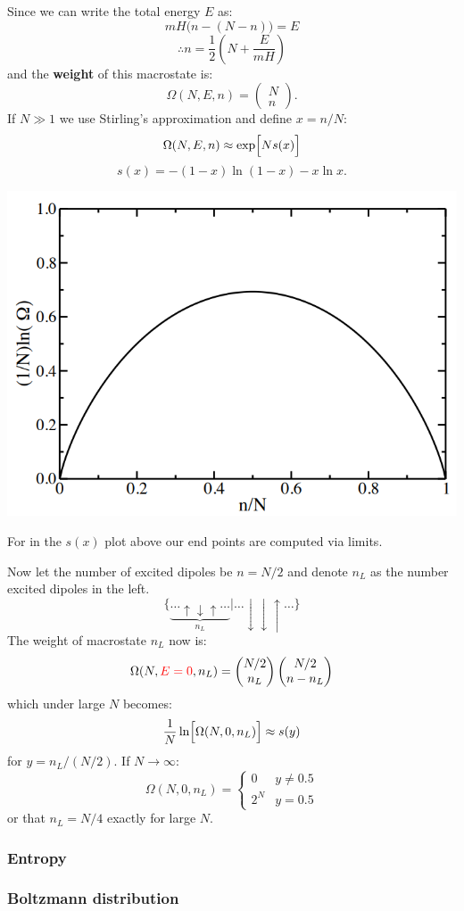 \documentclass{article}
\begin{document}
\begin{multicols*}{3}
Since we can write the total energy $E$ as:
$$mH\bigl(n-(N-n)\bigr)=E$$
$$\therefore n=\frac{1}{2}\left(N+\frac{E}{mH}\right)$$
and the \textbf{weight} of this macrostate is:
$$\Omega(N,E,n)=\begin{pmatrix}
N \\ n\end{pmatrix}.$$
If $N\gg1$ we use Stirling's approximation
and define $x=n/N$: 
$$\Omega(N,E,n)\approx\exp\Bigl[N s(x)\Bigr]$$
$$s(x)=-(1-x)\ln(1-x)-x\ln x.$$
\begin{center}
    \includegraphics*[scale=0.5]{f00.png}
\end{center}
For in the $s(x)$ plot above
our end points are computed via limits.

Now let the number of excited dipoles be
$n=N/2$ and denote $n_L$ as the number excited
dipoles in the left.
$$\{\underbrace{\dots\uparrow
\downarrow\uparrow\dots}_{\text{$n_L$}}|
\dots\downarrow\downarrow\uparrow\dots\}$$
The weight of macrostate $n_L$ now is:
$$\Omega(N,\textcolor{red}{E=0},n_L)=
\begin{pmatrix}N/2 \\ n_L\end{pmatrix}
\begin{pmatrix}N/2 \\ n-n_L\end{pmatrix}$$
which under large $N$ becomes:
$$\frac{1}{N}\ln\Bigl[\Omega(N,0,n_L)\Bigr]\approx s(y)$$
for $y=n_L/(N/2)$. If $N\rightarrow\infty$:
$$\Omega(N,0,n_L)=\left\{\begin{array}{ll}
0 &y\neq0.5 \\ 2^N &y=0.5\end{array}\right.$$
or that $n_L=N/4$ exactly for large $N$.

\subsubsection*{Entropy}

\subsubsection*{Boltzmann distribution}

\end{multicols*}
\end{document}
